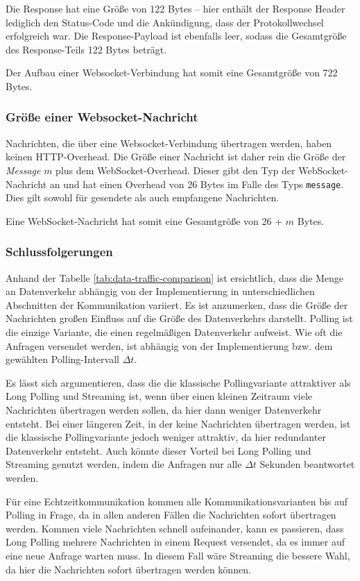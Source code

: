 \documentclass[sigplan, screen]{acmart}
\begin{document}
Die Response hat eine Größe von 122 Bytes – hier enthält der Response Header lediglich den Status-Code und die Ankündigung, dass der Protokollwechsel erfolgreich war.
Die Response-Payload ist ebenfalls leer, sodass die Gesamtgröße des Response-Teils 122 Bytes beträgt.

Der Aufbau einer Websocket-Verbindung hat somit eine Gesamtgröße von 722 Bytes.

\subsubsection{Größe einer Websocket-Nachricht}
Nachrichten, die über eine Websocket-Verbindung übertragen werden, haben keinen HTTP-Overhead.
Die Größe einer Nachricht ist daher rein die Größe der \emph{Message} $m$ plus dem WebSocket-Overhead.
Dieser gibt den Typ der WebSocket-Nachricht an und hat einen Overhead von 26 Bytes im Falle des Typs \texttt{message}.
Dies gilt sowohl für gesendete als auch empfangene Nachrichten.

Eine WebSocket-Nachricht hat somit eine Gesamtgröße von 26 + $m$ Bytes.

\subsubsection{Schlussfolgerungen}

Anhand der Tabelle \ref{tab:data-traffic-comparison} ist ersichtlich, dass die Menge an Datenverkehr abhängig von der Implementierung in unterschiedlichen Abschnitten der Kommunikation variiert.
Es ist anzumerken, dass die Größe der Nachrichten großen Einfluss auf die Größe des Datenverkehrs darstellt.
Polling ist die einzige Variante, die einen regelmäßigen Datenverkehr aufweist.
Wie oft die Anfragen versendet werden, ist abhängig von der Implementierung bzw. dem gewählten Polling-Intervall $\Delta t$.

Es lässt sich argumentieren, dass die die klassische Pollingvariante attraktiver als Long Polling und Streaming ist, wenn über einen kleinen Zeitraum viele Nachrichten übertragen werden sollen, da hier dann weniger Datenverkehr entsteht.
Bei einer längeren Zeit, in der keine Nachrichten übertragen werden, ist die klassische Pollingvariante jedoch weniger attraktiv, da hier redundanter Datenverkehr entsteht.
Auch könnte dieser Vorteil bei Long Polling und Streaming genutzt werden, indem die Anfragen nur alle $\Delta t$ Sekunden beantwortet werden.

Für eine Echtzeitkommunikation kommen alle Kommunikationsvarianten bis auf Polling in Frage, da in allen anderen Fällen die Nachrichten sofort übertragen werden.
Kommen viele Nachrichten schnell aufeinander, kann es passieren, dass Long Polling mehrere Nachrichten in einem Request versendet, da es immer auf eine neue Anfrage warten muss.
In diesem Fall wäre Streaming die bessere Wahl, da hier die Nachrichten sofort übertragen werden können.
\end{document}
